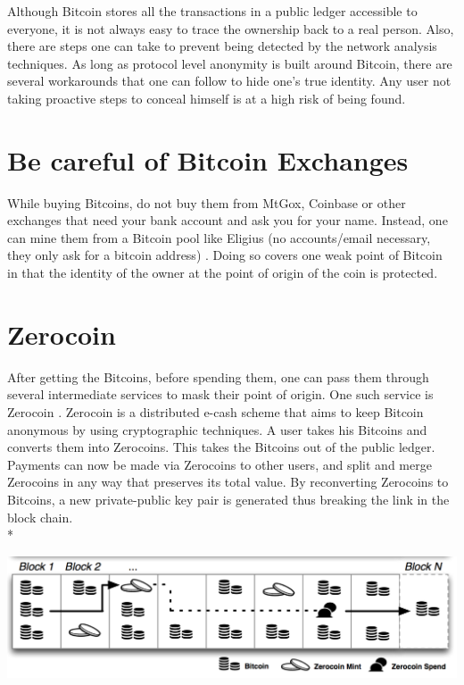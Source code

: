 Although Bitcoin stores all the transactions in a public
ledger accessible to everyone, it is not always easy to trace
the ownership back to a real person. Also, there are steps
one can take to prevent being detected by the network
analysis techniques. As long as protocol level anonymity is built around Bitcoin, there are several workarounds that one
can follow to hide one's true identity. Any user not taking proactive steps to conceal himself is at a high risk of being
found.

\section{Be careful of Bitcoin Exchanges}
While buying Bitcoins, do not buy them from MtGox, Coinbase or other exchanges that need your bank account and ask you
for your name. Instead, one can mine them from a Bitcoin pool
like Eligius (no accounts/email necessary, they only ask for
a bitcoin address) \cite{eli}. Doing so covers one weak point
of Bitcoin in that the identity of the owner at the point of
origin of the coin is protected.

\section{Zerocoin}
After getting the Bitcoins, before spending them, one can pass them through several intermediate services to mask their point of origin. One such service is Zerocoin \cite{zero}. 
Zerocoin is a distributed e-cash scheme that aims to keep Bitcoin anonymous by using cryptographic techniques. A user takes his Bitcoins and converts them into Zerocoins. This
takes the Bitcoins out of the public ledger. Payments can now
be made via Zerocoins to other users, and split and merge
Zerocoins in any way that preserves its total value. By
reconverting Zerocoins to Bitcoins, a new private-public key pair is generated thus breaking the link in the block chain.
\\*
\begin{center}
\includegraphics[scale=0.5]{images/zero.png}
\end{center}

